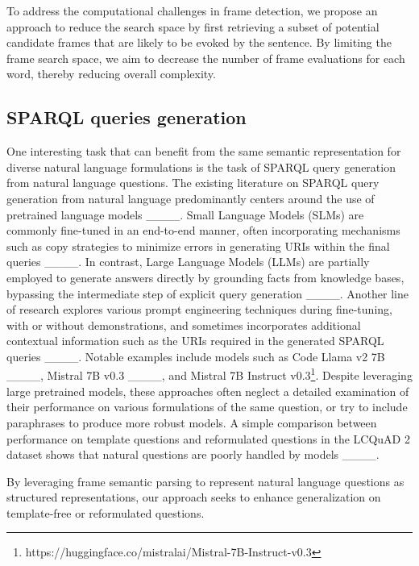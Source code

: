 To address the computational challenges in frame detection, we propose an approach to reduce the search space by first retrieving a subset of potential candidate frames that are likely to be evoked by the sentence. By limiting the frame search space, we aim to decrease the number of frame evaluations for each word, thereby reducing overall complexity.

\subsection{SPARQL queries generation}
One interesting task that can benefit from the same semantic representation for diverse natural language formulations is the task of SPARQL query generation from natural language questions. The existing literature on SPARQL query generation from natural language predominantly centers around the use of pretrained language models ____. Small Language Models (SLMs) are commonly fine-tuned in an end-to-end manner, often incorporating mechanisms such as copy strategies to minimize errors in generating URIs within the final queries ____. In contrast, Large Language Models (LLMs) are partially employed to generate answers directly by grounding facts from knowledge bases, bypassing the intermediate step of explicit query generation ____. Another line of research explores various prompt engineering techniques during fine-tuning, with or without demonstrations, and sometimes incorporates additional contextual information such as the URIs required in the generated SPARQL queries ____. Notable examples include models such as Code Llama v2 7B ____, Mistral 7B v0.3 ____, and Mistral 7B Instruct v0.3\footnote{https://huggingface.co/mistralai/Mistral-7B-Instruct-v0.3}. Despite leveraging large pretrained models, these approaches often neglect a detailed examination of their performance on various formulations of the same question, or try to include paraphrases to produce more robust models. A simple comparison between performance on template questions and reformulated questions in the LCQuAD 2 dataset shows that natural questions are poorly handled by models ____.   

By leveraging frame semantic parsing to represent natural language questions as structured representations, our approach seeks to enhance generalization on template-free or reformulated questions.